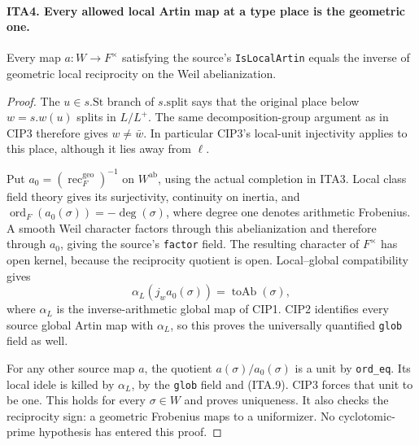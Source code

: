 \documentclass[11pt,a4paper]{article}
\numberwithin{equation}{section}
\theoremstyle{remark}\newtheorem{remark}[theorem]{Remark}
\begin{document}
\paragraph{ITA4. Every allowed local Artin map at a type place is the geometric one.}
\label{claim:ITA4}
Every map $a:W\to F^\times$ satisfying the source's
\texttt{Is\allowbreak Local\allowbreak Artin} equals the inverse of geometric local
reciprocity on the Weil abelianization.
\begin{proof}
The $u\in s.\mathrm{St}$ branch of $s.\mathrm{split}$
says that the original place below $w=s.w(u)$ splits in
$L/L^+$.  The same decomposition-group argument as in
CIP3 therefore gives $w\ne\bar w$.  In particular CIP3's
local-unit injectivity applies to this place, although
it lies away from $\ell$.

Put $a_0=(\operatorname{rec}^{\mathrm{geo}}_F)^{-1}$ on
$W^{\mathrm{ab}}$, using the actual completion in ITA3.
Local class field theory gives its surjectivity, continuity
on inertia, and
$\operatorname{ord}_F(a_0(\sigma))=-\deg(\sigma)$,
where degree one denotes arithmetic Frobenius.  A smooth
Weil character factors through this abelianization and
therefore through $a_0$, giving the source's \texttt{factor}
field.  The resulting character of $F^\times$ has open
kernel, because the reciprocity quotient is open.
Local--global compatibility gives
\[
       \alpha_L(j_w a_0(\sigma))=\operatorname{toAb}(\sigma),
                                                               \tag{ITA.9}
\]
where $\alpha_L$ is the inverse-arithmetic global map of
CIP1.  CIP2 identifies every source global Artin map with
$\alpha_L$, so this proves the universally quantified
\texttt{glob} field as well.

For any other source map $a$, the quotient
$a(\sigma)/a_0(\sigma)$ is a unit by \texttt{ord\_\allowbreak eq}.
Its local idele is killed by $\alpha_L$, by the
\texttt{glob} field and (ITA.9).  CIP3 forces that unit
to be one.  This holds for every $\sigma\in W$ and
proves uniqueness.  It also checks the reciprocity sign:
a geometric Frobenius maps to a uniformizer.  No
cyclotomic-prime hypothesis has entered this proof.
\end{proof}

\end{document}
